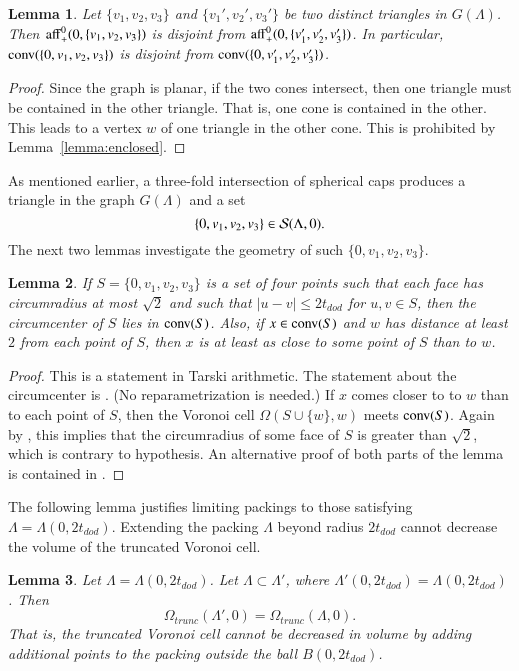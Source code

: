 \documentclass{article} %
\newtheorem{lemma}{Lemma}[subsection]
\begin{document}
\begin{lemma}  Let $\{v_1,v_2,v_3\}$ and $\{v_1',v_2',v_3'\}$
be two distinct triangles in $G(\Lambda)$.  Then
${\operatorname{aff}}_+^0(0,\{v_1,v_2,v_3\})$ is disjoint from
${\operatorname{aff}}_+^0(0,\{v_1',v_2',v_3'\})$.  In particular,
${\operatorname{conv}}(\{0,v_1,v_2,v_3\})$ is disjoint from
${\operatorname{conv}}(\{0,v_1',v_2',v_3'\})$.
\end{lemma}

\begin{proof} Since the graph is planar, if the two cones
intersect, then one triangle must be contained in the other
triangle.  That is, one cone is contained in the other.  This
leads to a vertex $w$ of one triangle in the other
cone.  This is prohibited
by Lemma~\ref{lemma:enclosed}.
\end{proof}

As mentioned earlier, a three-fold intersection of spherical
caps produces a triangle in the graph $G(\Lambda)$ and a 
set 
$$\{0,v_1,v_2,v_3\}\in {\mathcal S}(\Lambda,0).$$
The next two lemmas investigate the geometry of such $\{0,v_1,v_2,v_3\}$.

\begin{lemma}\label{lemma:Q}
If $S=\{0,v_1,v_2,v_3\}$ is a set of four points such that each
face has circumradius at most $\sqrt2$ and such that
$|u-v|\le 2t_{dod}$ for $u,v\in S$, then
the circumcenter of $S$ lies in ${\operatorname{conv}}(S)$.  Also, if $x
\in {\operatorname{conv}}(S)$ and $w$ has distance at least $2$ from each
point of $S$, then $x$ is at least as close to some point of $S$ than to
$w$.
\end{lemma}

\begin{proof} This is a statement in Tarski arithmetic.
The statement about the circumcenter is \cite[Lemma~5.18]{DCG}.
(No reparametrization is needed.)
If $x$  comes closer to  to $w$  than to each point of $S$, then
the Voronoi cell $\Omega(S\cup\{w\},w)$ meets ${\operatorname{conv}}(S)$.
Again by \cite[Lemma~5.18]{DCG}, this implies that the circumradius
of some face of $S$ is greater than $\sqrt2$, which is contrary
to hypothesis. An alternative proof 
of both parts of the lemma
is contained in \cite[Lemma~3.5,3.6]{arx}.
\end{proof}

The following lemma justifies limiting packings to those
satisfying $\Lambda=\Lambda(0,2t_{dod})$.  Extending the packing
$\Lambda$ beyond radius $2t_{dod}$ cannot decrease the volume of the
truncated Voronoi cell.

\begin{lemma}\label{lemma:trunc}  
Let $\Lambda=\Lambda(0,2t_{dod})$.  Let $\Lambda\subset\Lambda'$,
where $\Lambda'(0,2t_{dod}) = \Lambda(0,2t_{dod})$.  Then
$$\Omega_{trunc}(\Lambda',0) = \Omega_{trunc}(\Lambda,0).
$$
That is, the truncated Voronoi cell cannot be decreased in volume by
adding additional points to the packing outside the ball $B(0,2t_{dod})$.
\end{lemma}
\end{document}
